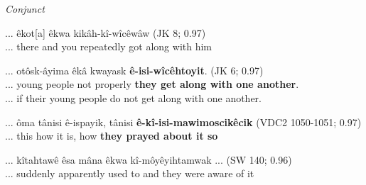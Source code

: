 \vspace{5mm}
\textit{Conjunct}

    \begin{exe}
    \ex
    \gll ... êkot[a] êkwa kikâh-kî-wîcêwâw \tiny{(JK 8; 0.97)}\\
    ... there and {you repeatedly got along with him} \\
    \label{ic6}
    \end{exe}
    
    \begin{exe}
    \ex
    \gll ... otôsk-âyima êkâ kwayask \textbf{ê-isi-wîcêhtoyit}. \tiny{(JK 6; 0.97)}\\
         ... {young people} not properly  {\textbf{they get along with one another}}.  \\
    \trans ... if their young people do not get along with one another. \tiny{\citep[14]{KaNipitehtew1998}}
    \label{ic7}
    \end{exe}
    
    \begin{exe}
    \ex 
    \gll ... ôma  tânisi ê-ispayik, tânisi \textbf{ê-kî-isi-mawimoscikêcik} \tiny{(VDC2 1050-1051; 0.97)}\\ 
            ... this how {it is}, how {\textbf{they prayed about it so}}\\
    \label{ic8}
    \end{exe}
    
    \begin{exe}
    \ex 
    \gll ... kîtahtawê êsa mâna êkwa kî-môyêyihtamwak ... \tiny{(SW 140; 0.96)} \\
    ... suddenly apparently {used to} and {they were aware of it} \\
    \label{ic9}
    \end{exe}
    
